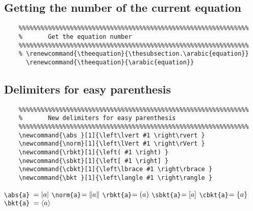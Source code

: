 \documentclass{article}
\begin{document}
\subsection{Getting the number of the current equation}
\begin{verbatim}
    %%%%%%%%%%%%%%%%%%%%%%%%%%%%%%%%%%%%%%%%%%%%%%%%%%%%%%%%%%%%%%%
    %       Get the equation number
    %%%%%%%%%%%%%%%%%%%%%%%%%%%%%%%%%%%%%%%%%%%%%%%%%%%%%%%%%%%%%%%
    % \renewcommand{\theequation}{\thesubsection.\arabic{equation}}
      \renewcommand{\theequation}{\arabic{equation}}
\end{verbatim}

\subsection{Delimiters for easy parenthesis}
\begin{minipage}[t]{0.78\textwidth}
    \begin{verbatim}
    %%%%%%%%%%%%%%%%%%%%%%%%%%%%%%%%%%%%%%%%%%%%%%%%%%%%%%%%%%%%%%%
    %       New delimiters for easy parenthesis
    %%%%%%%%%%%%%%%%%%%%%%%%%%%%%%%%%%%%%%%%%%%%%%%%%%%%%%%%%%%%%%%
    \newcommand{\abs }[1]{\left\lvert #1 \right\rvert }
    \newcommand{\norm}[1]{\left\lVert #1 \right\rVert }
    \newcommand{\rbkt}[1]{\left( #1 \right) }
    \newcommand{\sbkt}[1]{\left[ #1 \right] }
    \newcommand{\cbkt}[1]{\left\lbrace #1 \right\rbrace }
    \newcommand{\bkt }[1]{\left\langle #1 \right\rangle }
    \end{verbatim}
\end{minipage}
\begin{minipage}[t]{0.18\textwidth}
    \null\null\null
    \verb!\abs{a} !$=\abs{a}$\newline
    \verb!\norm{a}!$=\norm{a}$\newline
    \verb!\rbkt{a}!$=\rbkt{a}$\newline
    \verb!\sbkt{a}!$=\sbkt{a}$\newline
    \verb!\cbkt{a}!$=\cbkt{a}$\newline
    \verb!\bkt{a} !$=\bkt{a}$\newline
\end{minipage}
\end{document}
